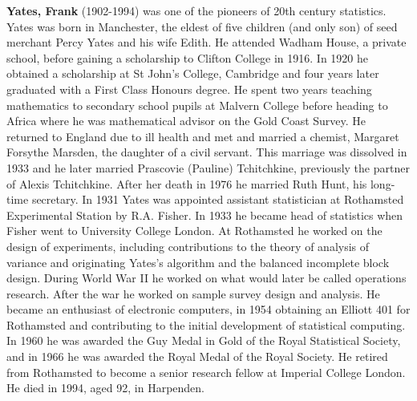 \textbf{Yates, Frank} (1902-1994) was one of the pioneers of 20th century statistics. Yates was born in Manchester, the eldest of five children (and only son) of seed merchant Percy Yates and his wife Edith. He attended Wadham House, a private school, before gaining a scholarship to Clifton College in 1916. In 1920 he obtained a scholarship at St John's College, Cambridge and four years later graduated with a First Class Honours degree. He spent two years teaching mathematics to secondary school pupils at Malvern College before heading to Africa where he was mathematical advisor on the Gold Coast Survey. He returned to England due to ill health and met and married a chemist, Margaret Forsythe Marsden, the daughter of a civil servant. This marriage was dissolved in 1933 and he later married Prascovie (Pauline) Tchitchkine, previously the partner of Alexis Tchitchkine. After her death in 1976 he married Ruth Hunt, his long-time secretary. In 1931 Yates was appointed assistant statistician at Rothamsted Experimental Station by R.A. Fisher. In 1933 he became head of statistics when Fisher went to University College London. At Rothamsted he worked on the design of experiments, including contributions to the theory of analysis of variance and originating Yates's algorithm and the balanced incomplete block design. During World War II he worked on what would later be called operations research. After the war he worked on sample survey design and analysis. He became an enthusiast of electronic computers, in 1954 obtaining an Elliott 401 for Rothamsted and contributing to the initial development of statistical computing. In 1960 he was awarded the Guy Medal in Gold of the Royal Statistical Society, and in 1966 he was awarded the Royal Medal of the Royal Society. He retired from Rothamsted to become a senior research fellow at Imperial College London. He died in 1994, aged 92, in Harpenden.

